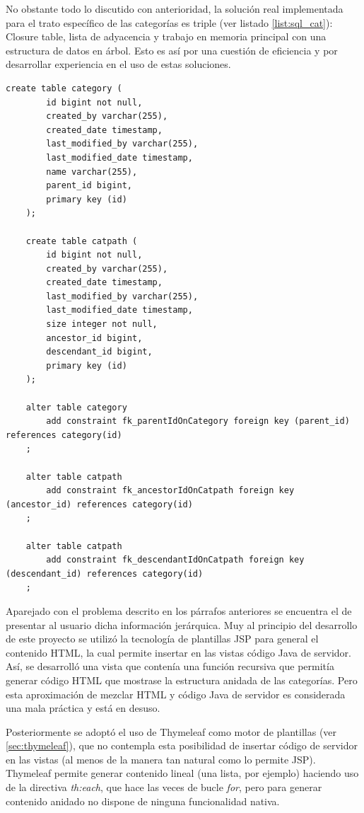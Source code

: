 \documentclass[a4paper,12pt,twoside,openright]{report}
\begin{document}
    No obstante todo lo discutido con anterioridad, la solución real implementada para el trato específico de las categorías es triple (ver listado \ref{list:sql_cat}): Closure table, lista de adyacencia y trabajo en memoria principal con una estructura de datos en árbol. Esto es así por una cuestión de eficiencia y por desarrollar experiencia en el uso de estas soluciones.
    \\
    
    \begin{lstlisting}[caption=Tablas que gestionan las categorías,label=list:sql_cat]
    create table category (
    	id bigint not null, 
    	created_by varchar(255), 
    	created_date timestamp, 
    	last_modified_by varchar(255), 
    	last_modified_date timestamp, 
    	name varchar(255), 
    	parent_id bigint, 
    	primary key (id)
    );
    	
    create table catpath (
    	id bigint not null, 
    	created_by varchar(255), 
    	created_date timestamp, 
    	last_modified_by varchar(255), 
    	last_modified_date timestamp, 
    	size integer not null, 
    	ancestor_id bigint, 
    	descendant_id bigint, 
    	primary key (id)
    );
    
    alter table category 
    	add constraint fk_parentIdOnCategory foreign key (parent_id) references category(id)
    ;
    
    alter table catpath 
    	add constraint fk_ancestorIdOnCatpath foreign key (ancestor_id) references category(id)
    ;
    
    alter table catpath 
    	add constraint fk_descendantIdOnCatpath foreign key (descendant_id) references category(id)
    ;
    \end{lstlisting}
    
    Aparejado con el problema descrito en los párrafos anteriores se encuentra el de presentar al usuario dicha información jerárquica. Muy al principio del desarrollo de este proyecto se utilizó la tecnología de plantillas JSP para general el contenido HTML, la cual permite insertar en las vistas código Java de servidor. Así, se desarrolló una vista que contenía una función recursiva que permitía generar código HTML que mostrase la estructura anidada de las categorías. Pero esta aproximación de mezclar HTML y código Java de servidor es considerada una mala práctica y está en desuso.
    
    Posteriormente se adoptó el uso de Thymeleaf como motor de plantillas (ver \ref{sec:thymeleaf}), que no contempla esta posibilidad de insertar código de servidor en las vistas (al menos de la manera tan natural como lo permite JSP). Thymeleaf permite generar contenido lineal (una lista, por ejemplo) haciendo uso de la directiva \emph{th:each}, que hace las veces de bucle \emph{for}, pero para generar contenido anidado no dispone de ninguna funcionalidad nativa.
    
\end{document}
